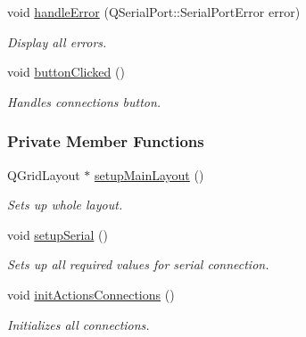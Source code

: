 \begin{DoxyCompactItemize}
void \hyperlink{classMainWindow_a19690cb09dbe0abd4252c6b8236d6810}{handle\+Error} (Q\+Serial\+Port\+::\+Serial\+Port\+Error error)
\begin{DoxyCompactList}\small\item\em Display all errors. \end{DoxyCompactList}\item 
void \hyperlink{classMainWindow_a922a5c49b11ae3ec01663b409cfc35c1}{button\+Clicked} ()
\begin{DoxyCompactList}\small\item\em Handles connection\textquotesingle{}s button. \end{DoxyCompactList}\end{DoxyCompactItemize}
\subsubsection*{Private Member Functions}
\begin{DoxyCompactItemize}
\item 
Q\+Grid\+Layout $\ast$ \hyperlink{classMainWindow_a19f1d3f1ccdc04be0f5f63f0c99264f4}{setup\+Main\+Layout} ()
\begin{DoxyCompactList}\small\item\em Sets up whole layout. \end{DoxyCompactList}\item 
void \hyperlink{classMainWindow_a74ab7a387068bddadc3e665ba64b73b8}{setup\+Serial} ()
\begin{DoxyCompactList}\small\item\em Sets up all required values for serial connection. \end{DoxyCompactList}\item 
void \hyperlink{classMainWindow_a5235529d74723de1e3686da400dd1d37}{init\+Actions\+Connections} ()
\begin{DoxyCompactList}\small\item\em Initializes all connections. \end{DoxyCompactList}\end{DoxyCompactItemize}
